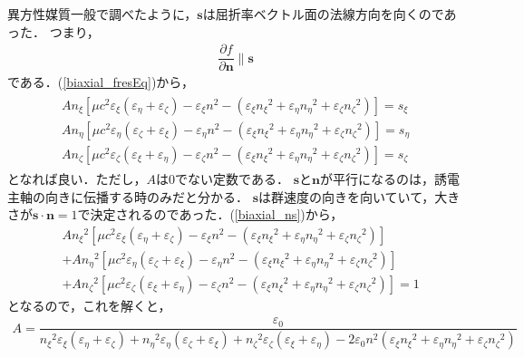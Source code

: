 異方性媒質一般で調べたように，$\boldsymbol{s}$は屈折率ベクトル面の法線方向を向くのであった．
つまり，
\begin{align}
  \dfrac{\partial f}{\partial\boldsymbol{n}}\parallel\boldsymbol{s}\label{biaxial_fns}
\end{align}
である．(\ref{biaxial_fresEq})から，
\begin{align}
  \begin{split}
    An_\xi\left[\mu{c^2}\varepsilon_\xi(\varepsilon_\eta+\varepsilon_\zeta)-\varepsilon_\xi{n^2}-(\varepsilon_{\xi}{n_\xi}^2+\varepsilon_{\eta}{n_\eta}^2+\varepsilon_{\zeta}{n_\zeta}^2)\right]=s_\xi\\
    An_\eta\left[\mu{c^2}\varepsilon_\eta(\varepsilon_\zeta+\varepsilon_\xi)-\varepsilon_\eta{n^2}-(\varepsilon_{\xi}{n_\xi}^2+\varepsilon_{\eta}{n_\eta}^2+\varepsilon_{\zeta}{n_\zeta}^2)\right]=s_\eta\\
    An_\zeta\left[\mu{c^2}\varepsilon_\zeta(\varepsilon_\xi+\varepsilon_\eta)-\varepsilon_\zeta{n^2}-(\varepsilon_{\xi}{n_\xi}^2+\varepsilon_{\eta}{n_\eta}^2+\varepsilon_{\zeta}{n_\zeta}^2)\right]=s_\zeta
  \end{split}\label{biaxial_ns}
\end{align}
となれば良い．ただし，$A$は0でない定数である．
$\boldsymbol{s}$と$\boldsymbol{n}$が平行になるのは，誘電主軸の向きに伝播する時のみだと分かる．
$\boldsymbol{s}$は群速度の向きを向いていて，大きさが$\boldsymbol{s}\cdot\boldsymbol{n}=1$で決定されるのであった．(\ref{biaxial_ns})から，
\begin{align*}
  & A{n_\xi}^2\left[\mu{c^2}\varepsilon_\xi(\varepsilon_\eta+\varepsilon_\zeta)-\varepsilon_\xi{n^2}-(\varepsilon_{\xi}{n_\xi}^2+\varepsilon_{\eta}{n_\eta}^2+\varepsilon_{\zeta}{n_\zeta}^2)\right]\\
  &+ A{n_\eta}^2\left[\mu{c^2}\varepsilon_\eta(\varepsilon_\zeta+\varepsilon_\xi)-\varepsilon_\eta{n^2}-(\varepsilon_{\xi}{n_\xi}^2+\varepsilon_{\eta}{n_\eta}^2+\varepsilon_{\zeta}{n_\zeta}^2)\right]\\
  &+ A{n_\zeta}^2\left[\mu{c^2}\varepsilon_\zeta(\varepsilon_\xi+\varepsilon_\eta)-\varepsilon_\zeta{n^2}-(\varepsilon_{\xi}{n_\xi}^2+\varepsilon_{\eta}{n_\eta}^2+\varepsilon_{\zeta}{n_\zeta}^2)\right]=1
\end{align*}
となるので，これを解くと，
\begin{align}
  A=\dfrac{\varepsilon_0}{{n_\xi}^2\varepsilon_\xi\left(\varepsilon_\eta+\varepsilon_\zeta\right)+{n_\eta}^2\varepsilon_\eta\left(\varepsilon_\zeta+\varepsilon_\xi\right)+{n_\zeta}^2\varepsilon_\zeta\left(\varepsilon_\xi+\varepsilon_\eta\right)-2\varepsilon_0n^2\left(\varepsilon_{\xi}{n_\xi}^2+\varepsilon_{\eta}{n_\eta}^2+\varepsilon_{\zeta}{n_\zeta}^2\right)}
\end{align}

